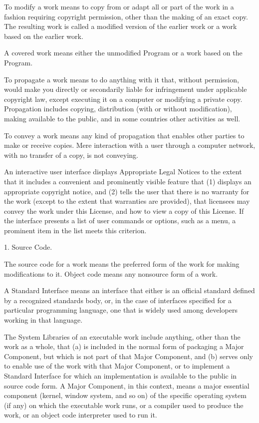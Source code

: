 \documentclass[a4paper,10pt,english]{sphinxmanual}
\begin{document}
\begin{sphinxVerbatim}[commandchars=\\\{\}]
  To \PYGZdq{}modify\PYGZdq{} a work means to copy from or adapt all or part of the work
in a fashion requiring copyright permission, other than the making of an
exact copy.  The resulting work is called a \PYGZdq{}modified version\PYGZdq{} of the
earlier work or a work \PYGZdq{}based on\PYGZdq{} the earlier work.

  A \PYGZdq{}covered work\PYGZdq{} means either the unmodified Program or a work based
on the Program.

  To \PYGZdq{}propagate\PYGZdq{} a work means to do anything with it that, without
permission, would make you directly or secondarily liable for
infringement under applicable copyright law, except executing it on a
computer or modifying a private copy.  Propagation includes copying,
distribution (with or without modification), making available to the
public, and in some countries other activities as well.

  To \PYGZdq{}convey\PYGZdq{} a work means any kind of propagation that enables other
parties to make or receive copies.  Mere interaction with a user through
a computer network, with no transfer of a copy, is not conveying.

  An interactive user interface displays \PYGZdq{}Appropriate Legal Notices\PYGZdq{}
to the extent that it includes a convenient and prominently visible
feature that (1) displays an appropriate copyright notice, and (2)
tells the user that there is no warranty for the work (except to the
extent that warranties are provided), that licensees may convey the
work under this License, and how to view a copy of this License.  If
the interface presents a list of user commands or options, such as a
menu, a prominent item in the list meets this criterion.

  1. Source Code.

  The \PYGZdq{}source code\PYGZdq{} for a work means the preferred form of the work
for making modifications to it.  \PYGZdq{}Object code\PYGZdq{} means any non\PYGZhy{}source
form of a work.

  A \PYGZdq{}Standard Interface\PYGZdq{} means an interface that either is an official
standard defined by a recognized standards body, or, in the case of
interfaces specified for a particular programming language, one that
is widely used among developers working in that language.

  The \PYGZdq{}System Libraries\PYGZdq{} of an executable work include anything, other
than the work as a whole, that (a) is included in the normal form of
packaging a Major Component, but which is not part of that Major
Component, and (b) serves only to enable use of the work with that
Major Component, or to implement a Standard Interface for which an
implementation is available to the public in source code form.  A
\PYGZdq{}Major Component\PYGZdq{}, in this context, means a major essential component
(kernel, window system, and so on) of the specific operating system
(if any) on which the executable work runs, or a compiler used to
produce the work, or an object code interpreter used to run it.


\end{sphinxVerbatim}
\end{document}
